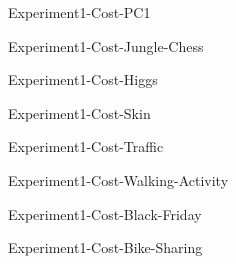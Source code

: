 \documentclass[sigconf,nonacm,screen]{acmart}
\begin{document}
  
        \begin{figure}[!ht]
            \centering
            
            \caption{Experiment1-Cost-PC1}
        \end{figure}  
    
  
        \begin{figure}[!ht]
            \centering
            
            \caption{Experiment1-Cost-Jungle-Chess}
        \end{figure}  
    
  
        \begin{figure}[!ht]
            \centering
            
            \caption{Experiment1-Cost-Higgs}
        \end{figure}  
    
  
        \begin{figure}[!ht]
            \centering
            
            \caption{Experiment1-Cost-Skin}
        \end{figure}  
    
  
        \begin{figure}[!ht]
            \centering
            
            \caption{Experiment1-Cost-Traffic}
        \end{figure}  
    
  
        \begin{figure}[!ht]
            \centering
            
            \caption{Experiment1-Cost-Walking-Activity}
        \end{figure}  
    
  
        \begin{figure}[!ht]
            \centering
            
            \caption{Experiment1-Cost-Black-Friday}
        \end{figure}  
    
  
        \begin{figure}[!ht]
            \centering
            
            \caption{Experiment1-Cost-Bike-Sharing}
        \end{figure}  
    
\end{document}
